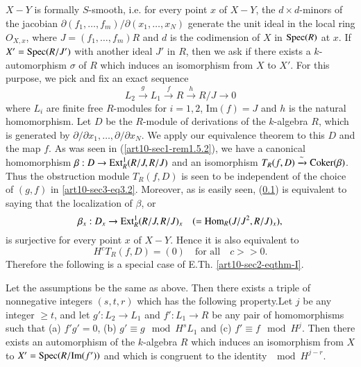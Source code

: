 \subsection{}\label{art10-sec3.1}
$X-Y$ is formally $S$-smooth, i.e. for every point $x$ of $X-Y$, the $d\times d$-minors of the jacobian $\partial(f_{1},\ldots,f_{m})/\partial(x_{1},\ldots,x_{N})$ generate the unit ideal in the local ring $O_{X,x}$, where $J=(f_{1},\ldots,f_{m})R$ and $d$ is the codimension of $X$ in $\operatorname{\mathrm{Spec}}(R)$ at $x$. If $X'=\operatorname{\mathrm{Spec}}(R/J')$ with another ideal $J'$ in $R$, then we ask if there exists a $k$-automorphism $\sigma$ of $R$ which induces an isomorphism from $X$ to $X'$. For this purpose, we pick and fix an exact sequence
\setcounter{equation}{1}
\begin{equation}
L_{2}\xrightarrow{g}L_{1}\xrightarrow{f}R\xrightarrow{h}R/J\to 0\label{art10-sec3-eq3.2}
\end{equation}
where $L_{i}$ are finite free $R$-modules for $i=1,2$, $\text{Im}(f)=J$ and $h$ is the natural homomorphism. Let $D$ be the $R$-module of derivations of the $k$-algebra $R$, which is generated by $\partial/\partial x_{1},\ldots,\partial/\partial x_{N}$. We apply our equivalence theorem to this $D$ and the map $f$. As was seen in (\ref{art10-sec1-rem1.5.2}), we have a canonical homomorphism $\beta:D\to \operatorname{\mathrm{Ext}}^{1}_{R}(R/J,R/J)$ and an isomorphism $T_{R}(f,D)\xrightarrow{\sim}\operatorname{\mathrm{Coker}}(\beta)$. Thus the obstruction module $T_{R}(f,D)$ is seen to be independent of the choice of $(g,f)$ in \eqref{art10-sec3-eq3.2}. Moreover, as is easily seen, (\ref{art10-sec3.1}) is equivalent to saying that the localization of $\beta$, or
$$
\beta_{x}:D_{x}\to \operatorname{\mathrm{Ext}}^{1}_{R}(R/J,R/J)_{x}\quad (=\operatorname{\mathrm{Hom}}_{R}(J/J^{2},R/J)_{x}),
$$
is surjective for every point $x$ of $X-Y$. Hence it is also equivalent to
\begin{equation}
H^{c}T_{R}(f,D)=(0)\quad\text{for all}\quad c>>0.\label{art10-sec3-eq3.3}
\end{equation}
Therefore the following is a special case of E.Th. \ref{art10-sec2-eqthm-I}.

\setcounter{theorem}{2}
\begin{theorem}\label{art10-sec3-thm3.3}
Let the assumptions be the same as above. Then there exists a triple of nonnegative integers $(s,t,r)$ which has the following property.\pageoriginale Let $j$ be any integer $\geq t$, and let $g':L_{2}\to L_{1}$ and $f':L_{1}\to R$ be any pair of homomorphisms such that {\rm(a)} $f'g'=0$, {\rm(b)} $g'\equiv g\mod H^{s}L_{1}$ and {\rm(c)} $f'\equiv f\mod H^{j}$. Then there exists an automorphism of the $k$-algebra $R$ which induces an isomorphism from $X$ to $X'=\operatorname{\mathrm{Spec}} (R/\text{\rm Im}(f'))$ and which is congruent to the identity $\mod H^{j-r}$.
\end{theorem}


